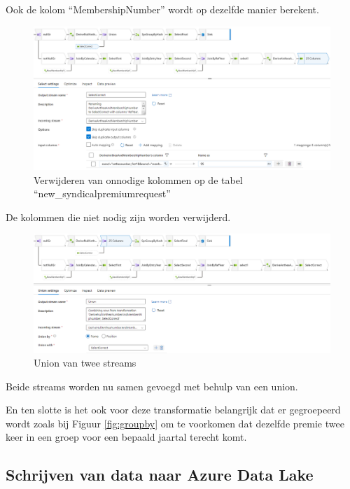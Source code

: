 Ook de kolom ``MembershipNumber'' wordt op dezelfde manier berekent.

\begin{figure}[H]
    \centering
    \includegraphics[width=1\textwidth]{./graphics/adf/member_8.png}
    \caption{Verwijderen van onnodige kolommen op de tabel ``new\_syndicalpremiumrequest''}
\end{figure}

De kolommen die niet nodig zijn worden verwijderd.

\begin{figure}[H]
    \includegraphics[width=1\textwidth]{./graphics/adf/member_9.png}
    \caption{Union van twee streams}
\end{figure}

Beide streams worden nu samen gevoegd met behulp van een union.

En ten slotte is het ook voor deze transformatie belangrijk dat er gegroepeerd wordt zoals bij Figuur \ref{fig:groupby} om te voorkomen dat dezelfde premie twee keer in een groep voor een bepaald jaartal terecht komt.

\subsection{Schrijven van data naar Azure Data Lake}


